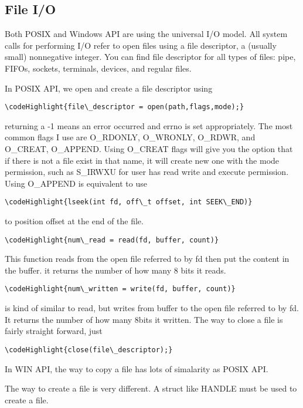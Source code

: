 \documentclass[10pt,draftclsnofoot,onecolumn,journal,compsoc]{IEEEtran}
\newcommand\codeHighlight[1]{\textcolor[rgb]{1,0,0}{\textbf{#1}}}
\begin{document}
\subsection*{File I/O}
Both POSIX and Windows API are using the universal I/O model. All system calls for performing I/O refer to open files using a file descriptor, a (usually small) nonnegative integer. You can find file descriptor for all types of files: pipe, FIFOs, sockets, terminals, devices, and regular files.\par
In POSIX API, we open and create a file descriptor using
\begin{Verbatim}[commandchars=\\\{\}]
\codeHighlight{file\_descriptor = open(path,flags,mode);}
\end{Verbatim}
returning a -1 means an error occurred and errno is set appropriately. The most common flags I use are O\_RDONLY, O\_WRONLY, O\_RDWR, and O\_CREAT, O\_APPEND. Using O\_CREAT flags will give you the option that if there is not a file exist in that name, it will create new one with the mode permission, such as S\_IRWXU for user has read write and execute permission. Using O\_APPEND is equivalent to use 
\begin{Verbatim}[commandchars=\\\{\}]
\codeHighlight{lseek(int fd, off\_t offset, int SEEK\_END)}
\end{Verbatim}
to position offset at the end of the file. 
\begin{Verbatim}[commandchars=\\\{\}]
\codeHighlight{num\_read = read(fd, buffer, count)}
\end{Verbatim}
This function reads from the open file referred to by fd then put the content in the buffer. it returns the number of how many 8 bits it reads.
\begin{Verbatim}[commandchars=\\\{\}]
\codeHighlight{num\_written = write(fd, buffer, count)}
\end{Verbatim} 
is kind of similar to read, but writes from buffer to the open file referred to by fd. It returns the number of how many 8bits it written. The way to close a file is fairly straight forward, just 
\begin{Verbatim}[commandchars=\\\{\}]
\codeHighlight{close(file\_descriptor);}
\end{Verbatim}
\par
In WIN API, the way to copy a file has lots of simalarity as POSIX API. \par
The way to create a file is very different. A struct like HANDLE must be used to create a file. \par
\par
\end{document}
